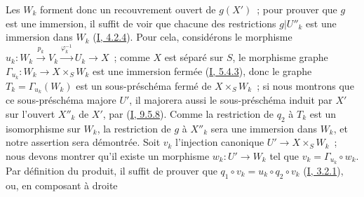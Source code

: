 Les $W_k$ forment donc un recouvrement ouvert de $g(X')$~; pour prouver que
$g$ est une immersion, il suffit de voir que chacune des restrictions
$g|U''_k$ est une immersion dans $W_k$
(\hyperref[I.4.2.4-fr]{I, 4.2.4}). Pour cela, considérons le morphisme
$u_k:W_k\xrightarrow{p_k}V_k\xrightarrow{\varphi_k^{-1}}U_k\to X$~; comme
$X$ est séparé sur $S$, le morphisme graphe
$\Gamma_{u_k}:W_k\to X\times_SW_k$ est une immersion fermée
(\hyperref[I.5.4.3-fr]{I, 5.4.3}), donc le graphe
$T_k=\Gamma_{u_k}(W_k)$ est un sous-préschéma fermé de $X\times_SW_k$~; si
nous montrons que ce sous-préschéma majore $U'$, il majorera aussi le
sous-préschéma induit par $X'$ sur l'ouvert $X''_k$ de $X'$, par
(\hyperref[I.9.5.8-fr]{I, 9.5.8}). Comme la restriction de $q_2$ à $T_k$ est
un isomorphisme sur $W_k$, la restriction de $g$ à $X''_k$ sera une immersion
dans $W_k$, et notre assertion sera démontrée. Soit $v_k$ l'injection
canonique $U'\to X\times_SW_k$~; nous devons montrer qu'il existe un morphisme
$w_k:U'\to W_k$ tel que $v_k=\Gamma_{u_k}\circ w_k$. Par définition du
produit, il suffit de prouver que
$q_1\circ v_k=u_k\circ q_2\circ v_k$
(\hyperref[I.3.2.1-fr]{I, 3.2.1}), ou, en composant à droite

